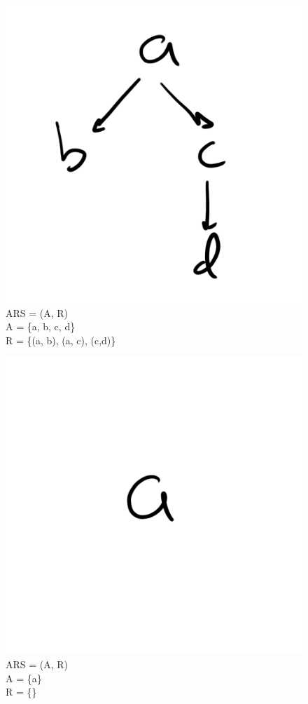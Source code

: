 \documentclass{article}
\begin{document}
{\begin{figure}[h!]
  \centering
  \includegraphics[scale=0.06]{gen4}
  \caption[] {
     ARS = (A, R) \\ A = \{a, b, c, d\} \\ R = \{(a, b), (a, c), (c,d)\}
    \endtabular}
\end{figure}

\begin{figure}[h!]
  \centering
  \includegraphics[scale=0.06]{gen5}
  \caption[] {
     ARS = (A, R) \\ A = \{a\} \\ R = \{\}
    \endtabular}
\end{figure}

}
\end{document}

